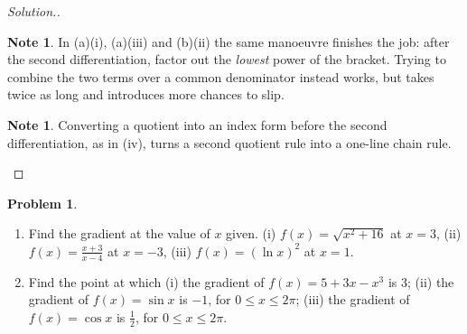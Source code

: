 \documentclass[11pt,a4paper]{article}
\theoremstyle{definition}
\newtheorem{note}[thm]{Note}
\newtheorem{problemx}{Problem}[section]
\newenvironment{problem}{\begin{problemx}}{\end{problemx}}
\newenvironment{solution}
  {\renewcommand{\qedsymbol}{}\begin{proof}[\textit{Solution}.]}
  {\end{proof}}
\begin{document}
\begin{solution}
\begin{note}
In (a)(i), (a)(iii) and (b)(ii) the same manoeuvre finishes the job: after the second
differentiation, factor out the \emph{lowest} power of the bracket. Trying to combine
the two terms over a common denominator instead works, but takes twice as long and
introduces more chances to slip.
\end{note}

\begin{note}
Converting a quotient into an index form before the second differentiation, as in (iv),
turns a second quotient rule into a one-line chain rule.
\end{note}
\end{solution}

\begin{problem}
\begin{enumerate}
\item[(a).] Find the gradient at the value of $x$ given.
\quad (i) $f(x)=\sqrt{x^2+16}$ at $x=3$, \quad (ii) $f(x)=\frac{x+3}{x-4}$ at $x=-3$,
\quad (iii) $f(x)=(\ln x)^2$ at $x=1$.
\item[(b).] Find the point at which
\quad (i) the gradient of $f(x)=5+3x-x^3$ is $3$;
\quad (ii) the gradient of $f(x)=\sin x$ is $-1$, for $0\leq x\leq 2\pi$;
\quad (iii) the gradient of $f(x)=\cos x$ is $\frac{1}{2}$, for $0\leq x\leq 2\pi$.
\end{enumerate}
\end{problem}
\end{document}
